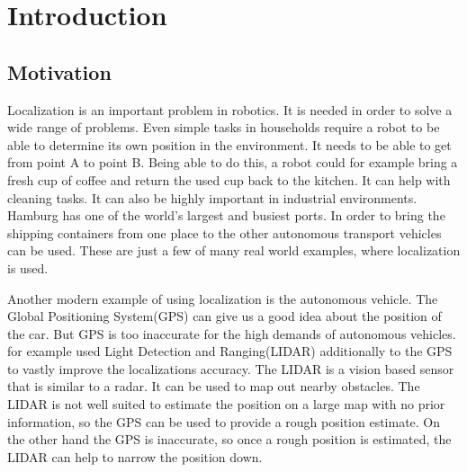 \chapter{Introduction} %
\label{Chapter1}

\section{Motivation}
Localization is an important problem in robotics. It is needed in order to solve a wide range of problems. Even simple tasks in households require a robot to be able to determine its own position in the environment. It needs to be able to get from point A to point B. Being able to do this, a robot could for example bring a fresh cup of coffee and return the used cup back to the kitchen. It can help with cleaning tasks\citep{pinheiro2015cleaning}. It can also be highly important in industrial environments. Hamburg has one of the world's largest and busiest ports. In order to bring the shipping containers from one place to the other autonomous transport vehicles can be used. These are just a few of many real world examples, where localization is used.

Another modern example of using localization is the autonomous vehicle. The Global Positioning System(\Gls{GPS})\citep{misra2006global} can give us a good idea about the position of the car. But \Gls{GPS} is too inaccurate for the high demands of autonomous vehicles. \citet{DBLP:conf/rss/LevinsonMT07} for example used Light Detection and Ranging(\Gls{LIDAR})\citep{Lidar} additionally to the \Gls{GPS} to vastly improve the localizations accuracy. The \Gls{LIDAR} is a vision based sensor that is similar to a radar. It can be used to map out nearby obstacles. The \Gls{LIDAR} is not well suited to estimate the position on a large map with no prior information, so the \Gls{GPS} can be used to provide a rough position estimate. On the other hand the \Gls{GPS} is inaccurate, so once a rough position is estimated, the \Gls{LIDAR} can help to narrow the position down. 

